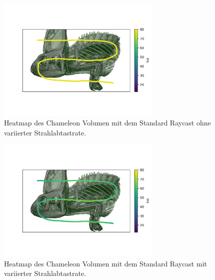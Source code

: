 
\begin{figure}
	\centering
	\includegraphics[width=0.7\textwidth]{../../Neue_Messungen/Chameleon/heatmaps/ms_data_st_chameleon_heatmap.png}
	\caption{Heatmap des Chameleon Volumen mit dem Standard Raycast ohne variierter Strahlabtastrate.}
	\label{fig::res::pf::hm_st}
\end{figure}

\begin{figure}
	\centering
	\includegraphics[width=0.7\textwidth]{../../Neue_Messungen/Chameleon/heatmaps/ms_data_st_rORS_chameleon_heatmap.png}
	\caption{Heatmap des Chameleon Volumen mit dem Standard Raycast mit variierter Strahlabtastrate.}
	\label{fig::res::pf::hm_st_ors}
\end{figure}

